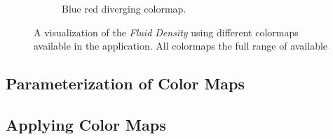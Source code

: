 \begin{figure}
\begin{subfigure}{0.44\textwidth}
		\caption{Blue red diverging colormap.}
		\label{fig:colormapping:intro:differntColorMaps:diverging}
	\end{subfigure}				

	\caption{A visualization of the \emph{Fluid Density} using different colormaps available in the application. All colormaps the full range of available}
	\label{fig:colormapping:colormaps}
\end{figure}

\subsection{Parameterization of Color Maps}

\subsection{Applying Color Maps}


